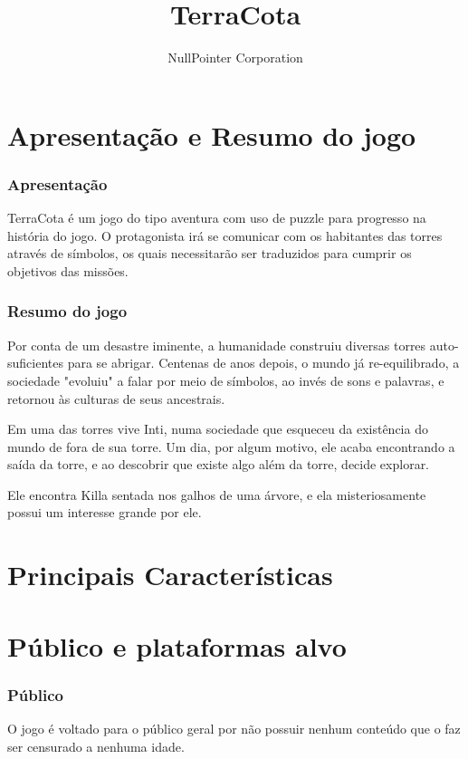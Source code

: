 \documentclass[11pt]{article}
\begin{document}
\title{TerraCota}
\author{NullPointer Corporation}
\date{}
\maketitle

\newpage

\tableofcontents
\newpage
\part{Apresentação e Resumo do jogo}
\section{Apresentação}
TerraCota é um jogo do tipo aventura com uso de puzzle para progresso na história do jogo.  O protagonista irá se comunicar com os habitantes das torres através de símbolos, os quais necessitarão ser traduzidos para cumprir os objetivos das missões.

\section{Resumo do jogo}
Por conta de um desastre iminente, a humanidade construiu diversas torres auto-suficientes para se abrigar.
Centenas de anos depois, o mundo já re-equilibrado, a sociedade "evoluiu" a falar por meio de símbolos, ao invés de sons e palavras, e retornou às culturas de seus ancestrais.

Em uma das torres vive Inti, numa sociedade que esqueceu da existência do mundo de fora de sua torre.
Um dia, por algum motivo, ele acaba encontrando a saída da torre, e ao descobrir que existe algo além da torre, decide explorar.

Ele encontra Killa sentada nos galhos de uma árvore, e ela misteriosamente possui um interesse grande por ele.
\newpage
\part{Principais Características}


\newpage
\part{Público e plataformas alvo}
\section{Público}
O jogo é voltado para o público geral por não possuir nenhum conteúdo que o faz ser censurado a nenhuma idade.
\end{document}
